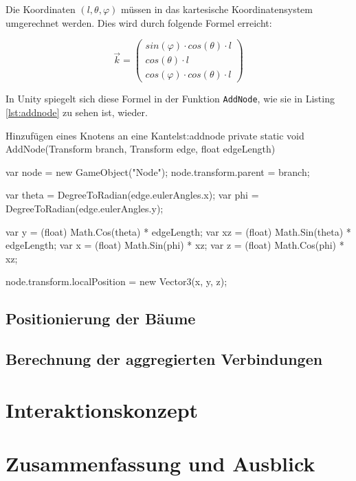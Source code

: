 Die Koordinaten $(l, \theta, \varphi)$ müssen in das kartesische Koordinatensystem umgerechnet werden. Dies wird durch folgende Formel erreicht:

\begin{equation}
  \vec{k} = 
  \begin{pmatrix}
    sin(\varphi) \cdot cos(\theta) \cdot l\\
    cos(\theta) \cdot l\\
    cos(\varphi) \cdot cos(\theta) \cdot l
  \end{pmatrix}
\end{equation}


In Unity spiegelt sich diese Formel in der Funktion \texttt{AddNode}, wie sie in Listing \ref{lst:addnode} zu sehen ist, wieder.

\begin{codesnippet}{Hinzufügen eines Knotens an eine Kante}{lst:addnode}
private static void AddNode(Transform branch, 
                            Transform edge, 
                            float edgeLength)
{
    var node = new GameObject("Node");
    node.transform.parent = branch;

    var theta = DegreeToRadian(edge.eulerAngles.x);
    var phi = DegreeToRadian(edge.eulerAngles.y);

    var y = (float) Math.Cos(theta) * edgeLength;
    var xz = (float) Math.Sin(theta) * edgeLength;
    var x = (float) Math.Sin(phi) * xz;
    var z = (float) Math.Cos(phi) * xz;

    node.transform.localPosition = new Vector3(x, y, z);
}
\end{codesnippet} 

%

\section{Positionierung der Bäume}

\section{Berechnung der aggregierten Verbindungen}

\chapter{Interaktionskonzept}
\label{ch:interaction}
\chapter{Zusammenfassung und Ausblick}
\label{ch:conclusion}
		